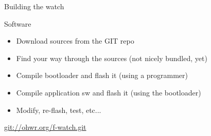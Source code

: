 \documentclass[compress,red]{beamer}
\begin{document}
\begin{frame}{Building the watch}

  Software

  \begin{itemize}
  \item Download sources from the GIT repo
  \item Find your way through the sources (not nicely bundled, yet)
  \item Compile bootloader and flash it (using a programmer)
  \item Compile application sw and flash it (using the bootloader)
  \item Modify, re-flash, test, etc...
  \end{itemize}

  \vskip 8mm

  \begin{center}
    \url{git://ohwr.org/f-watch.git}
  \end{center}

  \note[item]{}

\end{frame}
\end{document}
